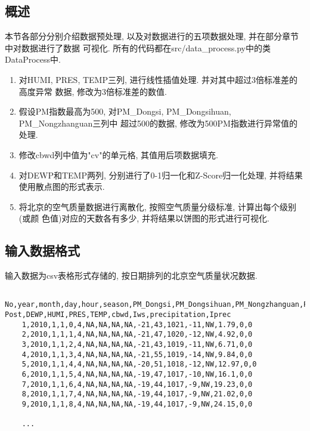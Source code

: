 \subsection{概述}
本节各部分分别介绍数据预处理, 以及对数据进行的五项数据处理, 并在部分章节中对数据进行了数据
可视化. 所有的代码都在src/data\_process.py中的类DataProcess中.
\begin{enumerate}
    \item 对HUMI, PRES, TEMP三列, 进行线性插值处理. 并对其中超过3倍标准差的高度异常
          数据, 修改为3倍标准差的数值.
    \item 假设PM指数最高为500, 对PM\_Dongsi, PM\_Dongsihuan, PM\_Nongzhanguan三列中
          超过500的数据, 修改为500PM指数进行异常值的处理.
    \item 修改cbwd列中值为"cv"的单元格, 其值用后项数据填充.
    \item 对DEWP和TEMP两列, 分别进行了0-1归一化和Z-Score归一化处理, 并将结果使用散点图的形式表示.
    \item 将北京的空气质量数据进行离散化, 按照空气质量分级标准, 计算出每个级别(或颜
          色值)对应的天数各有多少, 并将结果以饼图的形式进行可视化.
\end{enumerate}

\subsection{输入数据格式}
输入数据为csv表格形式存储的, 按日期排列的北京空气质量状况数据.
\begin{lstlisting}
    No,year,month,day,hour,season,PM_Dongsi,PM_Dongsihuan,PM_Nongzhanguan,PM_US Post,DEWP,HUMI,PRES,TEMP,cbwd,Iws,precipitation,Iprec
    1,2010,1,1,0,4,NA,NA,NA,NA,-21,43,1021,-11,NW,1.79,0,0
    2,2010,1,1,1,4,NA,NA,NA,NA,-21,47,1020,-12,NW,4.92,0,0
    3,2010,1,1,2,4,NA,NA,NA,NA,-21,43,1019,-11,NW,6.71,0,0
    4,2010,1,1,3,4,NA,NA,NA,NA,-21,55,1019,-14,NW,9.84,0,0
    5,2010,1,1,4,4,NA,NA,NA,NA,-20,51,1018,-12,NW,12.97,0,0
    6,2010,1,1,5,4,NA,NA,NA,NA,-19,47,1017,-10,NW,16.1,0,0
    7,2010,1,1,6,4,NA,NA,NA,NA,-19,44,1017,-9,NW,19.23,0,0
    8,2010,1,1,7,4,NA,NA,NA,NA,-19,44,1017,-9,NW,21.02,0,0
    9,2010,1,1,8,4,NA,NA,NA,NA,-19,44,1017,-9,NW,24.15,0,0
    
    ...
\end{lstlisting}

